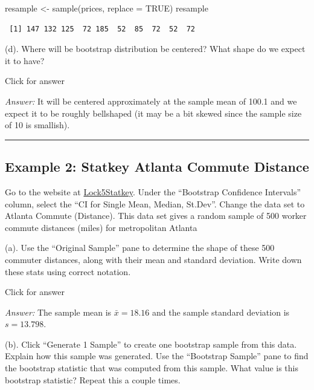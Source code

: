 \documentclass[
]{book}
\newenvironment{Shaded}{\begin{snugshade}}{\end{snugshade}}
\newcommand{\AttributeTok}[1]{\textcolor[rgb]{0.77,0.63,0.00}{#1}}
\newcommand{\ConstantTok}[1]{\textcolor[rgb]{0.00,0.00,0.00}{#1}}
\newcommand{\FunctionTok}[1]{\textcolor[rgb]{0.00,0.00,0.00}{#1}}
\newcommand{\NormalTok}[1]{#1}
\newcommand{\OtherTok}[1]{\textcolor[rgb]{0.56,0.35,0.01}{#1}}
\begin{document}
\begin{Shaded}
\begin{Highlighting}[]
\NormalTok{resample }\OtherTok{\textless{}{-}} \FunctionTok{sample}\NormalTok{(prices, }\AttributeTok{replace =} \ConstantTok{TRUE}\NormalTok{)}
\NormalTok{resample}
\end{Highlighting}
\end{Shaded}

\begin{verbatim}
 [1] 147 132 125  72 185  52  85  72  52  72
\end{verbatim}

(d). Where will be bootstrap distribution be centered? What shape do we expect it to have?

Click for answer

\emph{Answer:} It will be centered approximately at the sample mean of 100.1 and we expect it to be roughly bellshaped (it may be a bit skewed since the sample size of 10 is smallish).

\begin{center}\rule{0.5\linewidth}{0.5pt}\end{center}

\hypertarget{example-2-statkey-atlanta-commute-distance}{%
\subsection{Example 2: Statkey Atlanta Commute Distance}\label{example-2-statkey-atlanta-commute-distance}}

Go to the website at \href{http://www.lock5stat.com/StatKey/}{Lock5Statkey}. Under the ``Bootstrap Confidence Intervals'' column, select the ``CI for Single Mean, Median, St.Dev''. Change the data set to Atlanta Commute (Distance). This data set gives a random sample of 500 worker commute distances (miles) for metropolitan Atlanta

(a). Use the ``Original Sample'' pane to determine the shape of these 500 commuter distances, along with their mean and standard deviation. Write down these stats using correct notation.

Click for answer

\emph{Answer:} The sample mean is \(\bar{x} = 18.16\) and the sample standard deviation is \(s = 13.798\).

(b). Click ``Generate 1 Sample'' to create one bootstrap sample from this data. Explain how this sample was generated. Use the ``Bootstrap Sample'' pane to find the bootstrap statistic that was computed from this sample. What value is this bootstrap statistic? Repeat this a couple times.
\end{document}
